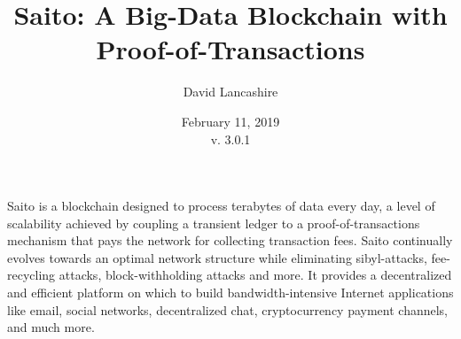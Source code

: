\documentclass[11.5pt, oneside]{article}   	%
\title{Saito: A Big-Data Blockchain with Proof-of-Transactions}
\author{David Lancashire}
\date{February 11, 2019\\v. 3.0.1}
\begin{document}
\maketitle


\begin{onecolabstract}
Saito is a blockchain designed to process terabytes of data every day, a level of scalability achieved by coupling a transient ledger to a proof-of-transactions mechanism that pays the network for collecting transaction fees. Saito continually evolves towards an optimal network structure while eliminating sibyl-attacks, fee-recycling attacks, block-withholding attacks and more. It provides a decentralized and efficient platform on which to build bandwidth-intensive Internet applications like email, social networks, decentralized chat, cryptocurrency payment channels, and much more.
\end{onecolabstract}
\end{document}
